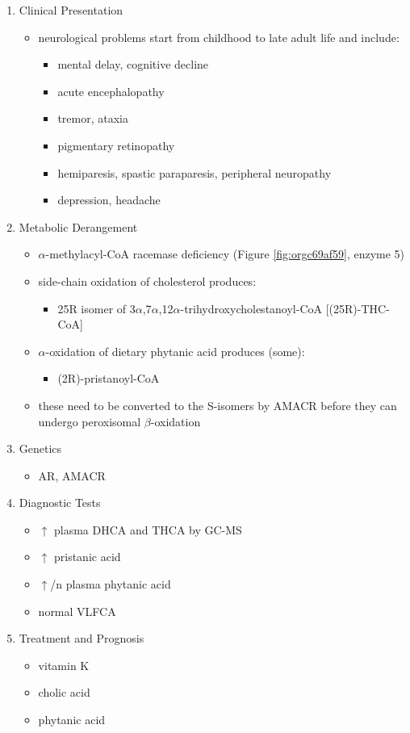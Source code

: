 \documentclass{scrartcl}
\begin{document}
\begin{enumerate}
\item Clinical Presentation
\label{sec:org9e01a53}
\begin{itemize}
\item neurological problems start from childhood to late adult life and
include:
\begin{itemize}
\item mental delay, cognitive decline
\item acute encephalopathy
\item tremor, ataxia
\item pigmentary retinopathy
\item hemiparesis, spastic paraparesis, peripheral neuropathy
\item depression, headache
\end{itemize}
\end{itemize}

\item Metabolic Derangement
\label{sec:orgca4004c}
\begin{itemize}
\item \(\alpha\)-methylacyl-CoA racemase deficiency (Figure \ref{fig:orgc69af59}, enzyme 5)
\item side-chain oxidation of cholesterol produces:
\begin{itemize}
\item 25R isomer of 3\(\alpha\),7\(\alpha\),12\(\alpha\)-trihydroxycholestanoyl-CoA [(25R)-THC-CoA]
\end{itemize}
\item \(\alpha\)-oxidation of dietary phytanic acid produces (some):
\begin{itemize}
\item (2R)-pristanoyl-CoA
\end{itemize}
\item these need to be converted to the S-isomers by AMACR before they can
undergo peroxisomal \(\beta\)-oxidation
\end{itemize}

\item Genetics
\label{sec:org9d498aa}
\begin{itemize}
\item AR, AMACR
\end{itemize}

\item Diagnostic Tests
\label{sec:org5d6c3d4}
\begin{itemize}
\item \(\uparrow\) plasma DHCA and THCA by GC-MS
\item \(\uparrow\) pristanic acid
\item \(\uparrow\)/n plasma phytanic acid
\item normal VLFCA
\end{itemize}

\item Treatment and Prognosis
\label{sec:org5391546}
\begin{itemize}
\item vitamin K
\item cholic acid
\item phytanic acid
\end{itemize}
\end{enumerate}
\end{document}
